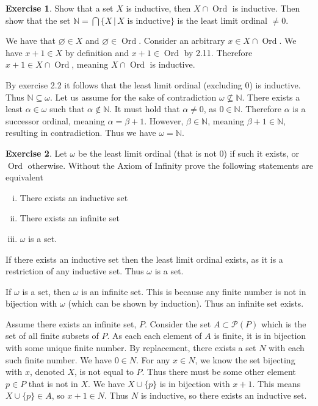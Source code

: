 \documentclass{article}
\theoremstyle{definition}
\newtheorem{exer}{Exercise}[section]
\newcommand{\powset}[1]{\mathcal{P}(#1)}
\newcommand{\N}{\mathbb{N}}
\newcommand*{\mtset}{\ensuremath{\varnothing}}
\DeclareMathOperator{\Ord}{Ord}
\newlength{\defparindent}
\newenvironment{answer}
    {\begin{mdframed}[backgroundcolor=gray!15, linewidth=0pt] \setlength{\parindent}{\defparindent}}
    {\end{mdframed}}
\begin{document}
\begin{exer}
    Show that a set $X$ is inductive, then $X \cap \Ord$ is inductive. Then show that the set $\N = \bigcap \{X \, | \, X \text{ is inductive}\}$ is the least limit ordinal $\ne 0$. 

    \begin{answer}
        We have that $\mtset \in X$ and $\mtset \in \Ord$. Consider an arbitrary $x \in X \cap \Ord$. We have $x + 1 \in X$ by definition and $x + 1 \in \Ord$ by 2.11. Therefore $x + 1 \in X \cap \Ord$, meaning $X \cap \Ord$ is inductive.
    
        By exercise 2.2 it follows that the least limit ordinal (excluding $0$) is inductive. Thus $\N \subseteq \omega$. Let us assume for the sake of contradiction $\omega \not\subseteq \N$. There exists a least $\alpha \in \omega$ such that $\alpha \not\in \N$. It must hold that $\alpha \ne 0$, as $0 \in \N$. Therefore $\alpha$ is a successor ordinal, meaning $\alpha = \beta + 1$. However, $\beta \in \N$, meaning $\beta + 1 \in \N$, resulting in contradiction. Thus we have $\omega = \N$.
    \end{answer}
\end{exer}

\newpage

\begin{exer}
    Let $\omega$ be the least limit ordinal (that is not $0$) if such it exists, or $\Ord$ otherwise. Without the Axiom of Infinity prove the following statements are equivalent
    \begin{enumerate}[(i)]
        \item There exists an inductive set
        \item There exists an infinite set
        \item $\omega$ is a set.
    \end{enumerate}

    \begin{answer}
        If there exists an inductive set then the least limit ordinal exists, as it is a restriction of any inductive set. Thus $\omega$ is a set.

        If $\omega$ is a set, then $\omega$ is an infinite set. This is because any finite number is not in bijection with $\omega$ (which can be shown by induction). Thus an infinite set exists.

        Assume there exists an infinite set, $P$. Consider the set $A \subset \powset{P}$ which is the set of all finite subsets of $P$. As each each element of $A$ is finite, it is in bijection with some unique finite number. By replacement, there exists a set $N$ with each such finite number. We have $0 \in N$. For any $x \in N$, we know the set bijecting with $x$, denoted $X$, is not equal to $P$. Thus there must be some other element $p \in P$ that is not in $X$. We have $X \cup \{p\}$ is in bijection with $x + 1$. This means $X \cup \{p\} \in A$, so $x + 1 \in N$. Thus $N$ is inductive, so there exists an inductive set.  
    \end{answer}
\end{exer}
\end{document}
